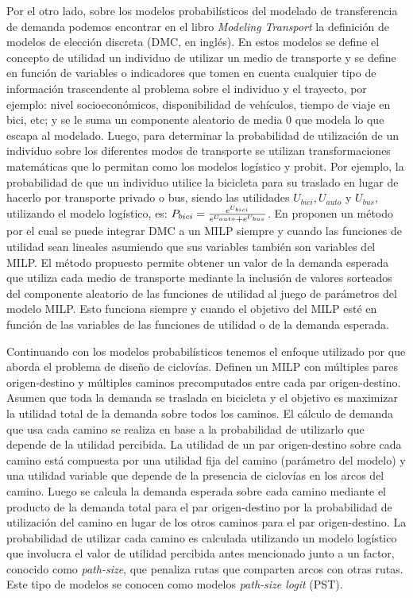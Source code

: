   Por el otro lado, sobre los modelos probabilísticos del modelado de transferencia de demanda podemos encontrar en el libro {\it Modeling Transport} \cite{ortuz2011} la definición de modelos de elección discreta (DMC, en inglés). En estos modelos se define el concepto de utilidad un individuo de utilizar un medio de transporte y se define en función de variables o indicadores que tomen en cuenta cualquier tipo de información trascendente al problema sobre el individuo y el trayecto, por ejemplo: nivel socioeconómicos, disponibilidad de vehículos, tiempo de viaje en bici, etc; y se le suma un componente aleatorio de media 0 que modela lo que escapa al modelado. Luego, para determinar la probabilidad de utilización de un individuo sobre los diferentes modos de transporte se utilizan transformaciones matemáticas que lo permitan como los modelos logístico y probit. Por ejemplo, la probabilidad de que un individuo utilice la bicicleta para su traslado en lugar de hacerlo por transporte privado o bus, siendo las utilidades $U_{bici}, U_{auto}$ y $U_{bus}$, utilizando el modelo logístico, es: $P_{bici} = {e^{U_{bici}} \over {e^{U_{auto}} + e^{U_{bus}}}}$. En \cite{Pacheco2021} proponen un método por el cual se puede integrar DMC a un MILP siempre y cuando las funciones de utilidad sean lineales asumiendo que sus variables también son variables del MILP. El método propuesto permite obtener un valor de la demanda esperada que utiliza cada medio de transporte mediante la inclusión de valores sorteados del componente aleatorio de las funciones de utilidad al juego de parámetros del modelo MILP. Esto funciona siempre y cuando el objetivo del MILP esté en función de las variables de las funciones de utilidad o de la demanda esperada.

  Continuando con los modelos probabilísticos tenemos el enfoque utilizado por \cite{Liu2019} que aborda el problema de diseño de ciclovías. Definen un MILP con múltiples pares origen-destino y múltiples caminos precomputados entre cada par origen-destino. Asumen que toda la demanda se traslada en bicicleta y el objetivo es maximizar la utilidad total de la demanda sobre todos los caminos. El cálculo de demanda que usa cada camino se realiza en base a la probabilidad de utilizarlo que depende de la utilidad percibida. La utilidad de un par origen-destino sobre cada camino está compuesta por una utilidad fija del camino (parámetro del modelo) y una utilidad variable que depende de la presencia de ciclovías en los arcos del camino. Luego se calcula la demanda esperada sobre cada camino mediante el producto de la demanda total para el par origen-destino por la probabilidad de utilización del camino en lugar de los otros caminos para el par origen-destino. La probabilidad de utilizar cada camino es calculada utilizando un modelo logístico que involucra el valor de utilidad percibida antes mencionado junto a un factor, conocido como {\it path-size}, que penaliza rutas que comparten arcos con otras rutas. Este tipo de modelos se conocen como modelos {\it path-size logit} (PST).

